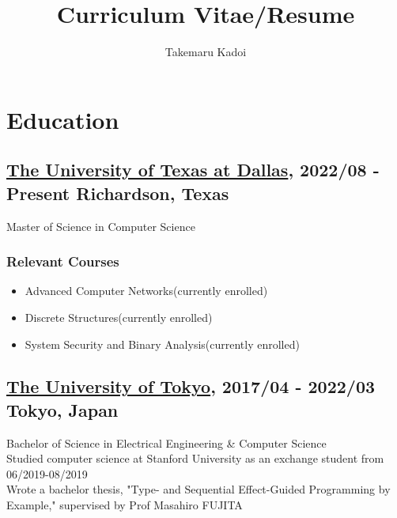 \documentclass[10pt]{article}
\title{\vspace{-1cm}Curriculum Vitae/Resume}
\author{Takemaru Kadoi}
\date{}
\begin{document}
\section*{Education}
  \subsection*{\underline{The University of Texas at Dallas}, 2022/08 - Present \hfill Richardson, Texas}
    Master of Science in Computer Science
    \subsubsection*{Relevant Courses}
    \begin{multicols}{2}
      \begin{itemize}[noitemsep]
        \item Advanced Computer Networks(currently enrolled)
        \item Discrete Structures(currently enrolled)
        \item System Security and Binary Analysis(currently enrolled)
      \end{itemize}
    \end{multicols}

  \subsection*{\underline{The University of Tokyo}, 2017/04 -  2022/03 \hfill Tokyo, Japan}
    Bachelor of Science in Electrical Engineering \& Computer Science
    \\
    Studied computer science at Stanford University as an exchange student from 06/2019-08/2019
    \\
    Wrote a bachelor thesis, "Type- and Sequential Effect-Guided Programming by Example," supervised by Prof Masahiro FUJITA
\end{document}
